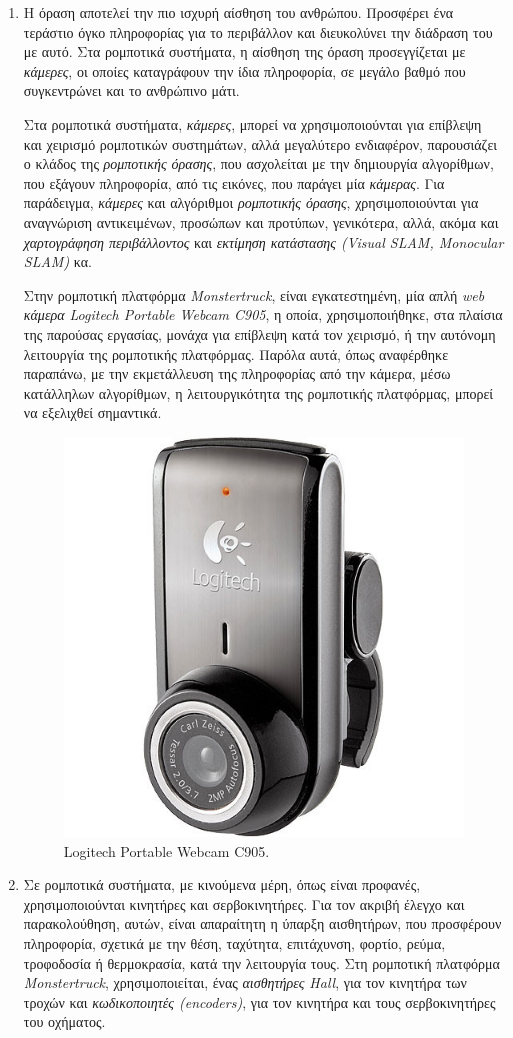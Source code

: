 \begin{enumerate}
\bigskip
\item
Η όραση αποτελεί την πιο ισχυρή αίσθηση του ανθρώπου. Προσφέρει ένα τεράστιο όγκο πληροφορίας για το περιβάλλον και διευκολύνει την διάδραση του με αυτό. Στα ρομποτικά συστήματα, η αίσθηση της όραση προσεγγίζεται με \textit{κάμερες}, οι οποίες καταγράφουν την ίδια πληροφορία, σε μεγάλο βαθμό που συγκεντρώνει και το ανθρώπινο μάτι.

Στα ρομποτικά συστήματα, \textit{κάμερες}, μπορεί να χρησιμοποιούνται για επίβλεψη και χειρισμό ρομποτικών συστημάτων, αλλά μεγαλύτερο ενδιαφέρον, παρουσιάζει ο κλάδος της \textit{ρομποτικής όρασης}, που ασχολείται με την δημιουργία αλγορίθμων, που εξάγουν πληροφορία, από τις εικόνες, που παράγει μία \textit{κάμερας}. Για παράδειγμα, \textit{κάμερες} και αλγόριθμοι \textit{ρομποτικής όρασης}, χρησιμοποιούνται για αναγνώριση αντικειμένων, προσώπων και προτύπων, γενικότερα, αλλά, ακόμα και \textit{χαρτογράφηση περιβάλλοντος} και \textit{εκτίμηση κατάστασης (Visual SLAM, Monocular SLAM)} κα.

Στην ρομποτική πλατφόρμα \textit{Monstertruck}, είναι εγκατεστημένη, μία απλή \textit{web κάμερα Logitech Portable Webcam C905}, η οποία, χρησιμοποιήθηκε, στα πλαίσια της παρούσας εργασίας, μονάχα για επίβλεψη κατά τον χειρισμό, ή την αυτόνομη λειτουργία της ρομποτικής πλατφόρμας. Παρόλα αυτά, όπως αναφέρθηκε παραπάνω, με την εκμετάλλευση της πληροφορίας από την κάμερα, μέσω κατάλληλων αλγορίθμων, η λειτουργικότητα της ρομποτικής πλατφόρμας, μπορεί να εξελιχθεί σημαντικά.

\begin{figure}[!ht]
	\centering
	\includegraphics[width=.4\linewidth]{Chapters/Chapter2/Figures/webcam.jpg}
	\caption{Logitech Portable Webcam C905.}
	\label{fig:webcam}
\end{figure}


\bigskip
\item
Σε ρομποτικά συστήματα, με κινούμενα μέρη, όπως είναι προφανές, χρησιμοποιούνται κινητήρες και σερβοκινητήρες. Για τον ακριβή έλεγχο και παρακολούθηση, αυτών, είναι απαραίτητη η ύπαρξη αισθητήρων, που προσφέρουν πληροφορία, σχετικά με την θέση, ταχύτητα, επιτάχυνση, φορτίο, ρεύμα, τροφοδοσία ή θερμοκρασία, κατά την λειτουργία τους. Στη ρομποτική πλατφόρμα \textit{Monstertruck}, χρησιμοποιείται, ένας \textit{αισθητήρες Hall}, για τον κινητήρα των τροχών και \textit{κωδικοποιητές (encoders)}, για τον κινητήρα και τους σερβοκινητήρες του οχήματος. 


\end{enumerate}
